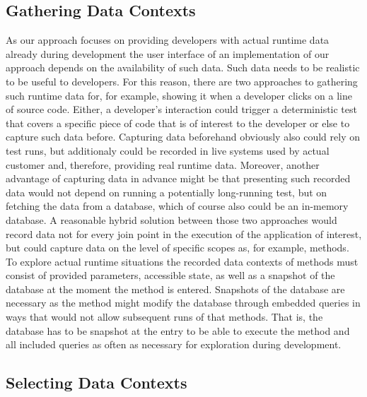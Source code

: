 \documentclass[runningheads]{llncs}
\newcommand\todo[1]{\nbnote{TO DO}{#1}}
\begin{document}
\subsection{Gathering Data Contexts}
As our approach focuses on providing developers with actual runtime data already during development the user interface of an implementation of our approach depends on the availability of such data.
Such data needs to be realistic to be useful to developers.
For this reason, there are two approaches to gathering such runtime data for, for example, showing it when a developer clicks on a line of source code.
Either, a developer's interaction could trigger a deterministic test that covers a specific piece of code that is of interest to the developer or else to capture such data before.
Capturing data beforehand obviously also could rely on test runs, but additionaly could be recorded in live systems used by actual customer and, therefore, providing real runtime data.
Moreover, another advantage of capturing data in advance might be that presenting such recorded data would not depend on running a potentially long-running test, but on fetching the data from a database, which of course also could be an in-memory database.
A reasonable hybrid solution between those two approaches would record data not for every join point in the execution of the application of interest, but could capture data on the level of specific scopes as, for example, methods.
To explore actual runtime situations the recorded data contexts of methods must consist of provided parameters, accessible state, as well as a snapshot of the database at the moment the method is entered.
Snapshots of the database are necessary as the method might modify the database through embedded queries in ways that would not allow subsequent runs of that methods.
That is, the database has to be snapshot at the entry to be able to execute the method and all included queries as often as necessary for exploration during development.
\todo{code example}
\subsection{Selecting Data Contexts}
\end{document}
